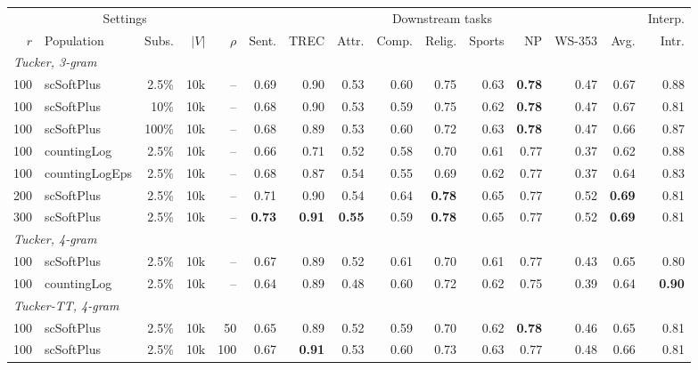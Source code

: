 \begin{table}[t]
  \centering
  \footnotesize
  \setlength{\tabcolsep}{4pt}
  \begin{tabular}{rlrrrrrrrrrrrrr}
    \toprule
    \multicolumn{5}{c}{Settings} & \multicolumn{9}{c}{Downstream tasks} & \multicolumn{1}{c}{Interp.} \\
    \cmidrule(lr){1-5} \cmidrule(lr){6-14} \cmidrule(lr){15-15}
    $r$ & Population & Subs. & $|V|$ & $\rho$ & Sent. & TREC & Attr. & Comp. & Relig. & Sports & NP & WS-353 & Avg. & Intr. \\
    \midrule
    \multicolumn{15}{l}{\textit{Tucker, 3-gram}} \\
    100 & scSoftPlus & 2.5\% & 10k & -- & 0.69 & 0.90 & 0.53 & 0.60 & 0.75 & 0.63 & \textbf{0.78} & 0.47 & 0.67 & 0.88 \\
    100 & scSoftPlus & 10\% & 10k & -- & 0.68 & 0.90 & 0.53 & 0.59 & 0.75 & 0.62 & \textbf{0.78} & 0.47 & 0.67 & 0.81 \\
    100 & scSoftPlus & 100\% & 10k & -- & 0.68 & 0.89 & 0.53 & 0.60 & 0.72 & 0.63 & \textbf{0.78} & 0.47 & 0.66 & 0.87 \\
    100 & countingLog & 2.5\% & 10k & -- & 0.66 & 0.71 & 0.52 & 0.58 & 0.70 & 0.61 & 0.77 & 0.37 & 0.62 & 0.88 \\
    100 & countingLogEps & 2.5\% & 10k & -- & 0.68 & 0.87 & 0.54 & 0.55 & 0.69 & 0.62 & 0.77 & 0.37 & 0.64 & 0.83 \\
    200 & scSoftPlus & 2.5\% & 10k & -- & 0.71 & 0.90 & 0.54 & 0.64 & \textbf{0.78} & 0.65 & 0.77 & 0.52 & \textbf{0.69} & 0.81 \\
    300 & scSoftPlus & 2.5\% & 10k & -- & \textbf{0.73} & \textbf{0.91} & \textbf{0.55} & 0.59 & \textbf{0.78} & 0.65 & 0.77 & 0.52 & \textbf{0.69} & 0.81 \\
    \midrule
    \multicolumn{15}{l}{\textit{Tucker, 4-gram}} \\
    100 & scSoftPlus & 2.5\% & 10k & -- & 0.67 & 0.89 & 0.52 & 0.61 & 0.70 & 0.61 & 0.77 & 0.43 & 0.65 & 0.80 \\
    100 & countingLog & 2.5\% & 10k & -- & 0.64 & 0.89 & 0.48 & 0.60 & 0.72 & 0.62 & 0.75 & 0.39 & 0.64 & \textbf{0.90} \\
    \midrule
    \multicolumn{15}{l}{\textit{Tucker-TT, 4-gram}} \\
    100 & scSoftPlus & 2.5\% & 10k & 50 & 0.65 & 0.89 & 0.52 & 0.59 & 0.70 & 0.62 & \textbf{0.78} & 0.46 & 0.65 & 0.81 \\
    100 & scSoftPlus & 2.5\% & 10k & 100 & 0.67 & \textbf{0.91} & 0.53 & 0.60 & 0.73 & 0.63 & 0.77 & 0.48 & 0.66 & 0.81 \\

\end{tabular}
\end{table}
